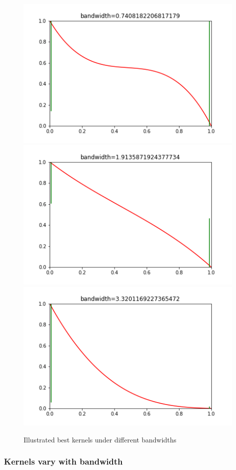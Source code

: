 \documentclass[a4 paper,12pt]{article}
\begin{document}
\begin{figure}
   \centering
   \includegraphics[scale=0.3]{case30_frame0000000.png}
   \includegraphics[scale=0.3]{case30_frame0000031.png}
   \includegraphics[scale=0.3]{case30_frame0000049.png}
   \caption{Illustrated best kernels under different bandwidths}
   \label{fig:kernels}
\end{figure}
\subsubsection*{Kernels vary with bandwidth}
\end{document}
